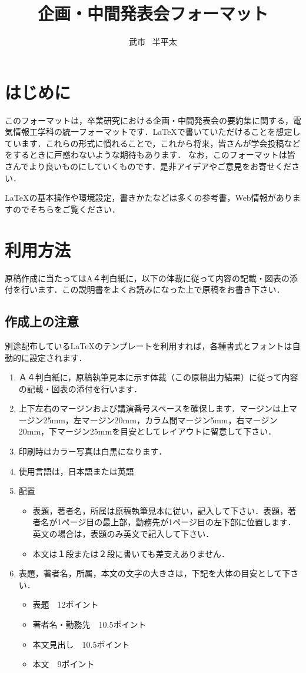 \documentclass{jsarticle}
\title{企画・中間発表会フォーマット}
\author{武市 ~半平太}
\begin{document}
\maketitle

\section{はじめに}
このフォーマットは，卒業研究における企画・中間発表会の要約集に関する，電気情報工学科の統一フォーマットです．{\LaTeX}で書いていただけることを想定しています．これらの形式に慣れることで，これから将来，皆さんが学会投稿などをするときに戸惑わないような期待もあります．
なお，このフォーマットは皆さんでより良いものにしていくものです．是非アイデアやご意見をお寄せください．

{\LaTeX}の基本操作や環境設定，書きかたなどは多くの参考書\cite{total}\cite{latex}\cite{okumura}，Web情報がありますのでそちらをご覧ください．

\section{利用方法}
原稿作成に当たってはA４判白紙に，以下の体裁に従って内容の記載・図表の添付を行います．この説明書をよくお読みになった上で原稿をお書き下さい．

\subsection{作成上の注意}
別途配布している{\LaTeX}のテンプレートを利用すれば，各種書式とフォントは自動的に設定されます．

\begin{enumerate}
  \item Ａ４判白紙に，原稿執筆見本に示す体裁（この原稿出力結果）に従って内容の記載・図表の添付を行います．
  \item 上下左右のマージンおよび講演番号スペースを確保します．マージンは上マージン25mm，左マージン20mm，カラム間マージン5mm，右マージン20mm，下マージン25mmを目安としてレイアウトに留意して下さい．
  \item 印刷時はカラー写真は白黒になります．
  \item 使用言語は，日本語または英語
  \item 配置
\begin{itemize}
  \item 	表題，著者名，所属は原稿執筆見本に従い，記入して下さい．表題，著者名が1ページ目の最上部，勤務先が1ページ目の左下部に位置します．英文の場合は，表題のみ英文で記入して下さい．
  \item 	本文は１段または２段に書いても差支えありません．
\end{itemize}
  \item 表題，著者名，所属，本文の文字の大きさは，下記を大体の目安として下さい．
\begin{itemize}
  \item 	表題　12ポイント
  \item 	著者名・勤務先　10.5ポイント
  \item 	本文見出し　10.5ポイント
  \item 	本文　9ポイント
\end{itemize}
\end{enumerate}
\end{document}
